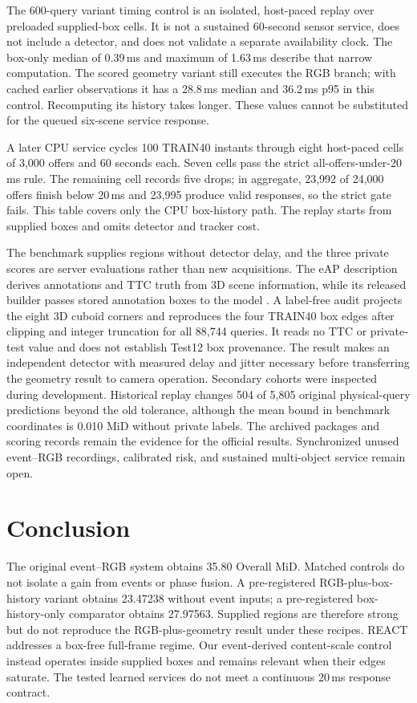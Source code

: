The 600-query variant timing control is an isolated, host-paced replay over preloaded supplied-box cells. It is not a sustained 60-second sensor service, does not include a detector, and does not validate a separate availability clock. The box-only median of 0.39\,ms and maximum of 1.63\,ms describe that narrow computation. The scored geometry variant still executes the RGB branch; with cached earlier observations it has a 28.8\,ms median and 36.2\,ms p95 in this control. Recomputing its history takes longer. These values cannot be substituted for the queued six-scene service response.

A later CPU service cycles 100 TRAIN40 instants through eight host-paced cells of 3,000 offers and 60 seconds each. Seven cells pass the strict all-offers-under-20\,ms rule. The remaining cell records five drops; in aggregate, 23,992 of 24,000 offers finish below 20\,ms and 23,995 produce valid responses, so the strict gate fails. This table covers only the CPU box-history path. The replay starts from supplied boxes and omits detector and tracker cost.

The benchmark supplies regions without detector delay, and the three private scores are server evaluations rather than new acquisitions. The eAP description derives annotations and TTC truth from 3D scene information, while its released builder passes stored annotation boxes to the model \citep{eap}. A label-free audit projects the eight 3D cuboid corners and reproduces the four TRAIN40 box edges after clipping and integer truncation for all 88,744 queries. It reads no TTC or private-test value and does not establish Test12 box provenance. The result makes an independent detector with measured delay and jitter necessary before transferring the geometry result to camera operation. Secondary cohorts were inspected during development. Historical replay changes 504 of 5,805 original physical-query predictions beyond the old tolerance, although the mean bound in benchmark coordinates is 0.010 MiD without private labels. The archived packages and scoring records remain the evidence for the official results. Synchronized unused event--RGB recordings, calibrated risk, and sustained multi-object service remain open.

\section{Conclusion}

The original event--RGB system obtains 35.80 Overall MiD. Matched controls do not isolate a gain from events or phase fusion. A pre-registered RGB-plus-box-history variant obtains 23.47238 without event inputs; a pre-registered box-history-only comparator obtains 27.97563. Supplied regions are therefore strong but do not reproduce the RGB-plus-geometry result under these recipes. REACT addresses a box-free full-frame regime. Our event-derived content-scale control instead operates inside supplied boxes and remains relevant when their edges saturate. The tested learned services do not meet a continuous 20\,ms response contract.
